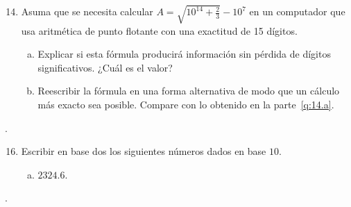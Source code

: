\documentclass[
	spanish,
	8pt,
	utf8,
	xcolor=table,
	handout,
	aspectratio=169,
	professionalfonts,
	mathserif,
	leqno,
]{beamer}
\begin{document}
\begin{frame}
	\begin{enumerate}\setcounter{enumi}{13}
		\item

		      Asuma que se necesita calcular
		      \begin{math}
			      A=
			      \sqrt{10^{14}+\frac{2}{3}}-10^{7}
		      \end{math}
		      en un computador que usa aritmética de punto flotante con
		      una exactitud de 15 dígitos.

		      \begin{enumerate}[a)]
			      \item\label{q:14.a}

			      Explicar si esta fórmula producirá información sin
			      pérdida de dígitos significativos.
			      ¿Cuál es el valor?

			      \item\label{q:14.b}

			      Reescribir la fórmula en una forma alternativa de
			      modo que un cálculo más exacto sea posible.
			      Compare con lo obtenido en la parte~\eqref{q:14.a}.
		      \end{enumerate}
	\end{enumerate}

	\begin{solution}
		.
	\end{solution}
\end{frame}

\begin{frame}
	\begin{enumerate}\setcounter{enumi}{15}
		\item

		      Escribir en base dos los siguientes números dados en base $10$.


		      \begin{enumerate}[a)]
			      \item

			            $2324.6$.
		      \end{enumerate}
	\end{enumerate}

	\begin{solution}
		.
	\end{solution}
\end{frame}
\end{document}
